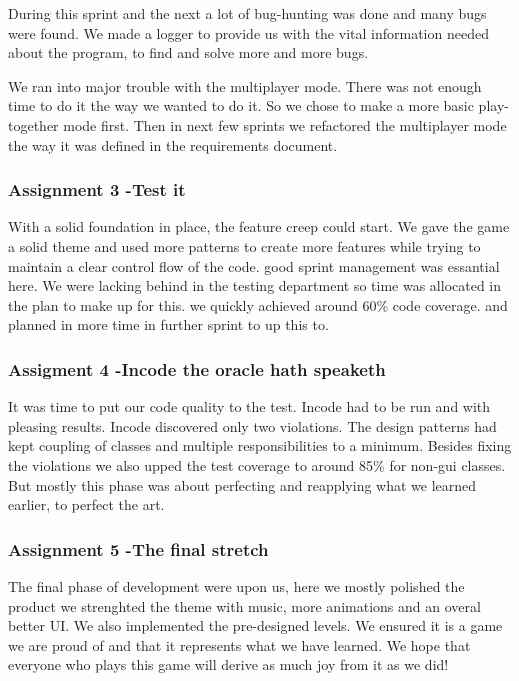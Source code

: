 \documentclass[a4paper]{article}
\begin{document}
During this sprint and the next a lot of bug-hunting was done and many bugs were found. We made a logger to provide us with the vital information needed about the program, to find and solve more and more bugs.

We ran into major trouble with the multiplayer mode. There was not enough time to do it the way we wanted to do it. So we chose to make a more basic play-together mode first. Then in next few sprints we refactored the multiplayer mode the way it was defined in the requirements document.

\subsubsection{Assignment 3 -Test it}
	With a solid foundation in place, the feature creep could start. We gave the game a solid theme and used more patterns to create more features while trying to maintain a clear control flow of the code. good sprint management was essantial here. We were lacking behind in the  testing department so time was allocated in the plan to make up for this.
 we quickly achieved around 60\% code coverage. and planned in more time in further sprint to up this to.
 
 \subsubsection{Assigment 4 -Incode the oracle hath speaketh
 }
 It was time to put our code quality to the test. Incode had to be run and with pleasing results. Incode discovered only two violations. The design patterns had kept coupling of classes and multiple responsibilities to a minimum.
 Besides fixing the violations we also upped the test coverage to around 85\% for non-gui classes. But mostly this phase was about perfecting and reapplying what we learned earlier, to perfect the art.
 
 \subsubsection{Assignment 5 -The final stretch}
 The final phase of development were upon us, here we mostly polished the product we strenghted the theme with music, more animations and an overal better UI. We also implemented the pre-designed levels. We ensured it is a game we are proud of and that it represents what we have learned. We hope that everyone who plays this game will derive as much joy from it as we did!
\end{document}
